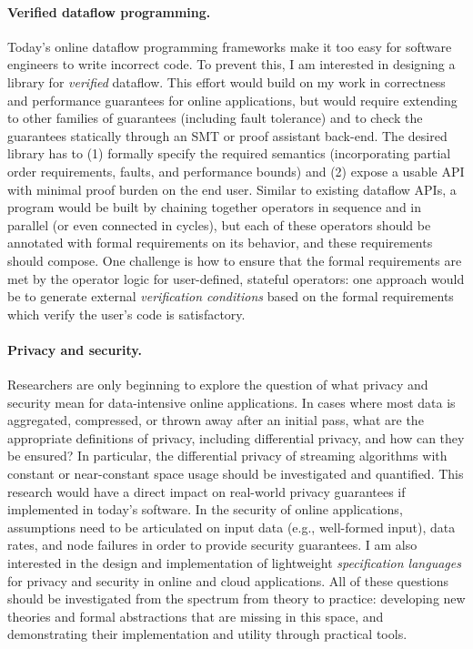 \paragraph{Verified dataflow programming.}
Today's online dataflow programming frameworks
make it too easy for software engineers to write incorrect code.
To prevent this, I am interested in designing a library for \emph{verified} dataflow.
This effort would build on my work in correctness and performance guarantees for online applications, but would require extending to other families of guarantees (including fault tolerance) and to check the guarantees statically through an SMT or proof assistant back-end.
The desired library has to (1) formally specify the required semantics (incorporating partial order requirements, faults, and performance bounds) and (2) expose a usable API with minimal proof burden on the end user.
Similar to existing dataflow APIs, a program would be built by chaining together operators in sequence and in parallel (or even connected in cycles),
but each of these operators should be annotated with formal requirements on its behavior, and these requirements should compose.
One challenge is how to ensure that the formal requirements are met by the operator logic for user-defined, stateful operators: one approach would be to generate external \emph{verification conditions} based on the formal requirements which verify the user's code is satisfactory.

\paragraph*{Privacy and security.}
Researchers are only beginning to explore the question of what privacy and security mean for data-intensive online applications.
In cases where most data is aggregated, compressed, or thrown away after an initial pass, what are the appropriate definitions of privacy, including differential privacy, and how can they be ensured?
In particular, the differential privacy of streaming algorithms with constant or near-constant space usage should be investigated and quantified.
This research would have a direct impact on real-world privacy guarantees if implemented in today's software.
In the security of online applications, assumptions need to be articulated on input data (e.g., well-formed input), data rates, and node failures in order to provide security guarantees.
I am also interested in the design and implementation of lightweight \emph{specification languages} for privacy and security in online and cloud applications.
All of these questions should be investigated from the spectrum from theory to practice: developing new theories and formal abstractions that are missing in this space, and demonstrating their implementation and utility through practical tools.

